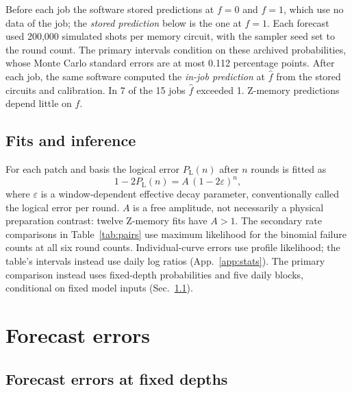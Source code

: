 \documentclass[aps,pra,reprint,nofootinbib,longbibliography,floatfix,showkeys]{revtex4-2}
\newcommand{\eps}{\varepsilon}
\newcommand{\PL}{P_{\mathrm{L}}}
\newcommand{\fhat}{\hat f}
\begin{document}
Before each job the software stored predictions at $f=0$ and $f=1$, which use no data of the job; the \emph{stored prediction} below is the one at $f=1$.
Each forecast used 200,000 simulated shots per memory circuit, with the sampler seed set to the round count.
The primary intervals condition on these archived probabilities, whose Monte Carlo standard errors are at most 0.112 percentage points.
After each job, the same software computed the \emph{in-job prediction} at $\fhat$ from the stored circuits and calibration.
In 7 of the 15 jobs $\fhat$ exceeded 1.
Z-memory predictions depend little on $f$.

\subsection{Fits and inference}
\label{sec:rules}
\label{sec:tests}

For each patch and basis the logical error $\PL(n)$ after $n$ rounds is fitted as
\begin{equation}
1-2\PL(n) = A\,(1-2\eps)^n ,
\label{eq:fit}
\end{equation}
where $\eps$ is a window-dependent effective decay parameter, conventionally called the logical error per round.
$A$ is a free amplitude, not necessarily a physical preparation contrast: twelve Z-memory fits have $A>1$.
The secondary rate comparisons in Table~\ref{tab:pairs} use maximum likelihood for the binomial failure counts at all six round counts.
Individual-curve errors use profile likelihood; the table's intervals instead use daily log ratios (App.~\ref{app:stats}).
The primary comparison instead uses fixed-depth probabilities and five daily blocks, conditional on fixed model inputs (Sec.~\ref{sec:size}).

\section{Forecast errors}
\label{sec:posthoc}

\subsection{Forecast errors at fixed depths}
\label{sec:size}
\end{document}
